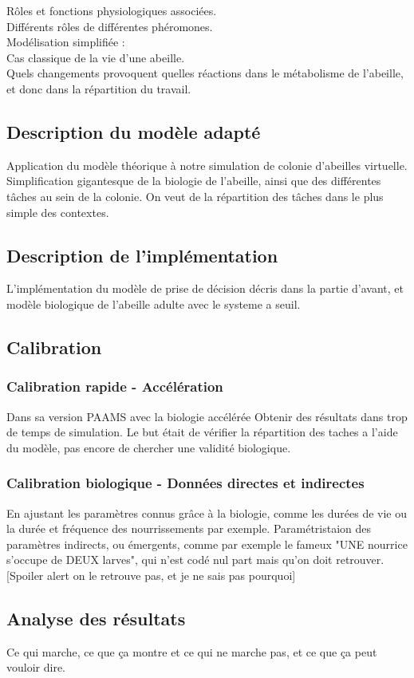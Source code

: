 \documentclass[11pt,a4paper]{article}
\begin{document}
		Rôles et fonctions physiologiques associées.\\
		Différents rôles de différentes phéromones.\\
		Modélisation simplifiée : \\
		Cas classique de la vie d'une abeille.\\
		Quels changements provoquent quelles réactions dans le métabolisme de l'abeille, et donc dans la répartition du travail.
	\subsection{Description du modèle adapté}
		Application du modèle théorique à notre simulation de colonie d'abeilles virtuelle.
		Simplification gigantesque de la biologie de l'abeille, ainsi que des différentes tâches au sein de la colonie.
		On veut de la répartition des tâches dans le plus simple des contextes.
	\subsection{Description de l'implémentation}
		L'implémentation du modèle de prise de décision décris dans la partie d'avant, et modèle biologique de l'abeille adulte avec le systeme a seuil.
	\subsection{Calibration}
		\subsubsection{Calibration rapide - Accélération}
			Dans sa version PAAMS avec la biologie accélérée
			Obtenir des résultats dans trop de temps de simulation. Le but était de vérifier la répartition des taches a l'aide du modèle, pas encore de chercher une validité biologique.
		\subsubsection{Calibration biologique - Données directes et indirectes}
			En ajustant les paramètres connus grâce à la biologie, comme les durées de vie ou la durée et fréquence des nourrissements par exemple.
			Paramétristaion des paramètres indirects, ou émergents, comme par exemple le fameux "UNE nourrice s'occupe de DEUX larves", qui n'est codé nul part mais qu'on doit retrouver. [Spoiler alert on le retrouve pas, et je ne sais pas pourquoi]
	\subsection{Analyse des résultats}
		Ce qui marche, ce que ça montre et ce qui ne marche pas, et ce que ça peut vouloir dire.
		
\end{document}
